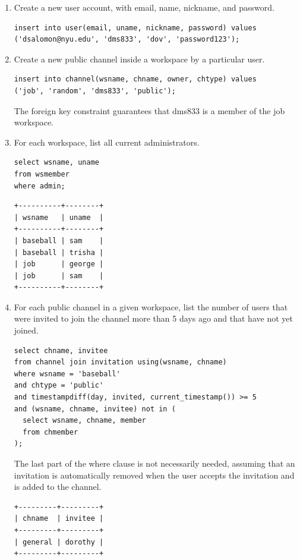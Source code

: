 \documentclass{article}
\begin{document}
\begin{enumerate}
\item
Create a new user account, with email, name, nickname, and password.
\begin{lstlisting}
insert into user(email, uname, nickname, password) values
('dsalomon@nyu.edu', 'dms833', 'dov', 'password123');
\end{lstlisting}

\item
Create a new public channel inside a workspace by a particular user.
\begin{lstlisting}
insert into channel(wsname, chname, owner, chtype) values
('job', 'random', 'dms833', 'public');
\end{lstlisting}

The foreign key constraint guarantees that dms833 is a member of the job workspace.

\item
For each workspace, list all current administrators.
\begin{lstlisting}
select wsname, uname
from wsmember
where admin;
\end{lstlisting}
\begin{verbatim}
+----------+--------+
| wsname   | uname  |
+----------+--------+
| baseball | sam    |
| baseball | trisha |
| job      | george |
| job      | sam    |
+----------+--------+
\end{verbatim}

\item
For each public channel in a given workspace, list the number of users that were invited to join the channel more than 5 days ago and that have not yet joined.
\begin{lstlisting}
select chname, invitee
from channel join invitation using(wsname, chname)
where wsname = 'baseball'
and chtype = 'public'
and timestampdiff(day, invited, current_timestamp()) >= 5
and (wsname, chname, invitee) not in (
  select wsname, chname, member
  from chmember
);
\end{lstlisting}

The last part of the where clause is not necessarily needed, assuming that an invitation is automatically removed when the user accepts the invitation and is added to the channel.
\begin{verbatim}
+---------+---------+
| chname  | invitee |
+---------+---------+
| general | dorothy |
+---------+---------+
\end{verbatim}


\end{enumerate}
\end{document}
